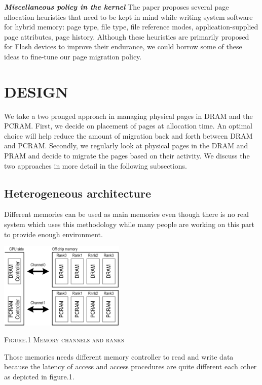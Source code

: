 \documentclass[a4paper, 11pt, conference]{ieeeconf}      %
\begin{document}
\textit{\textbf{Miscellaneous policy in the kernel}}
The paper \cite{mogul2009operating} proposes several page allocation heuristics that need to be kept in mind while writing system software for hybrid memory: page type, file type, file reference modes, application-supplied page attributes, page history.  Although these heuristics are primarily proposed for Flash devices to improve their endurance, we could borrow some of these ideas to fine-tune our page migration policy.


\section{DESIGN} \vspace{2mm}

We take a two pronged approach in managing physical pages in DRAM and the PCRAM. First, we decide on placement of pages at allocation time. An optimal choice will help reduce the amount of migration back and forth between DRAM and PCRAM. Secondly, we regularly look at physical pages in the DRAM and PRAM and decide to migrate the pages based on their activity. We discuss the two approaches in more detail in the following subsections.

\subsection{Heterogeneous architecture} \vspace{1mm}
Different memories can be used as main memories even though there is no real system which uses this methodology while many people are working on this part to provide enough environment. 

\vspace{2mm}
\includegraphics[width=0.45\textwidth]{Architecture/1-HeteroMem.jpg}
\begin{center}
  {\textsc{Figure.1 Memory channels and ranks}}
\end{center}

Those memories needs different memory controller to read and write data because the latency of access and access procedures are quite different each other as depicted in figure.1. 
\end{document}
